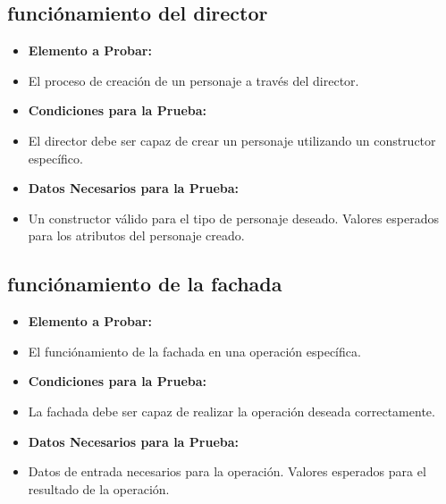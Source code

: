 \documentclass{article}
\begin{document}
\subsection{funciónamiento del director}
\renewcommand{\labelitemi}{}
\begin{itemize}

\item \textbf{Elemento a Probar:} 

\item El proceso de creación de un personaje a través del director.

\item \textbf{Condiciones para la Prueba:}

\item El director debe ser capaz de crear un personaje utilizando un constructor específico.

\item \textbf{Datos Necesarios para la Prueba:}

\item Un constructor válido para el tipo de personaje deseado.
Valores esperados para los atributos del personaje creado.

\end{itemize}

\subsection{funciónamiento de la fachada}
\renewcommand{\labelitemi}{}
\begin{itemize}

\item \textbf{Elemento a Probar:} 

\item El funciónamiento de la fachada en una operación específica.

\item \textbf{Condiciones para la Prueba:}

\item La fachada debe ser capaz de realizar la operación deseada correctamente.

\item \textbf{Datos Necesarios para la Prueba:}

\item Datos de entrada necesarios para la operación.
Valores esperados para el resultado de la operación.

\end{itemize}
\end{document}

